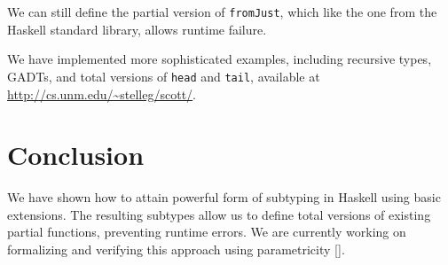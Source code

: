 \documentclass[]{article}
\newenvironment{Shaded}{}{}
\newcommand{\DataTypeTok}[1]{\textcolor[rgb]{0.56,0.13,0.00}{{#1}}}
\newcommand{\StringTok}[1]{\textcolor[rgb]{0.25,0.44,0.63}{{#1}}}
\newcommand{\OtherTok}[1]{\textcolor[rgb]{0.00,0.44,0.13}{{#1}}}
\newcommand{\FunctionTok}[1]{\textcolor[rgb]{0.02,0.16,0.49}{{#1}}}
\newcommand{\NormalTok}[1]{{#1}}
\begin{document}
We can still define the partial version of \texttt{fromJust}, which like
the one from the Haskell standard library, allows runtime failure.

\begin{Shaded}
\end{Shaded}

We have implemented more sophisticated examples, including recursive
types, GADTs, and total versions of \texttt{head} and \texttt{tail},
available at \url{http://cs.unm.edu/~stelleg/scott/}.

\section{Conclusion}\label{conclusion}

We have shown how to attain powerful form of subtyping in Haskell using
basic extensions. The resulting subtypes allow us to define total
versions of existing partial functions, preventing runtime errors. We
are currently working on formalizing and verifying this approach using
parametricity {[}\cite{wadler1989theorems}{]}.


\end{document}
